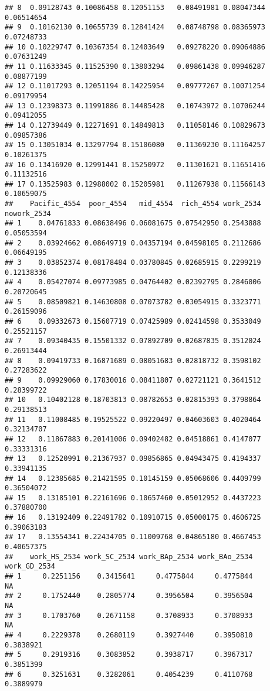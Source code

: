 \documentclass[
]{article}
\begin{document}
\begin{verbatim}
## 8  0.09128743 0.10086458 0.12051153   0.08491981 0.08047344    0.06514654
## 9  0.10162130 0.10655739 0.12841424   0.08748798 0.08365973    0.07248733
## 10 0.10229747 0.10367354 0.12403649   0.09278220 0.09064886    0.07631249
## 11 0.11633345 0.11525390 0.13803294   0.09861438 0.09946287    0.08877199
## 12 0.11017293 0.12051194 0.14225954   0.09777267 0.10071254    0.09179954
## 13 0.12398373 0.11991886 0.14485428   0.10743972 0.10706244    0.09412055
## 14 0.12739449 0.12271691 0.14849813   0.11058146 0.10829673    0.09857386
## 15 0.13051034 0.13297794 0.15106080   0.11369230 0.11164257    0.10261375
## 16 0.13416920 0.12991441 0.15250972   0.11301621 0.11651416    0.11132516
## 17 0.13525983 0.12988002 0.15205981   0.11267938 0.11566143    0.10659075
##    Pacific_4554  poor_4554   mid_4554  rich_4554 work_2534 nowork_2534
## 1    0.04761833 0.08638496 0.06081675 0.07542950 0.2543888  0.05053594
## 2    0.03924662 0.08649719 0.04357194 0.04598105 0.2112686  0.06649195
## 3    0.03852374 0.08178484 0.03780845 0.02685915 0.2299219  0.12138336
## 4    0.05427074 0.09773985 0.04764402 0.02392795 0.2846006  0.20720645
## 5    0.08509821 0.14630808 0.07073782 0.03054915 0.3323771  0.26159096
## 6    0.09332673 0.15607719 0.07425989 0.02414598 0.3533049  0.25521157
## 7    0.09340435 0.15501332 0.07892709 0.02687835 0.3512024  0.26913444
## 8    0.09419733 0.16871689 0.08051683 0.02818732 0.3598102  0.27283622
## 9    0.09929060 0.17830016 0.08411807 0.02721121 0.3641512  0.28399722
## 10   0.10402128 0.18703813 0.08782653 0.02815393 0.3798864  0.29138513
## 11   0.11008485 0.19525522 0.09220497 0.04603603 0.4020464  0.32134707
## 12   0.11867883 0.20141006 0.09402482 0.04518861 0.4147077  0.33331316
## 13   0.12520991 0.21367937 0.09856865 0.04943475 0.4194337  0.33941135
## 14   0.12385685 0.21421595 0.10145159 0.05068606 0.4409799  0.36504072
## 15   0.13185101 0.22161696 0.10657460 0.05012952 0.4437223  0.37880700
## 16   0.13192409 0.22491782 0.10910715 0.05000175 0.4606725  0.39063183
## 17   0.13554341 0.22434705 0.11009768 0.04865180 0.4667453  0.40657375
##    work_HS_2534 work_SC_2534 work_BAp_2534 work_BAo_2534 work_GD_2534
## 1     0.2251156    0.3415641     0.4775844     0.4775844           NA
## 2     0.1752440    0.2805774     0.3956504     0.3956504           NA
## 3     0.1703760    0.2671158     0.3708933     0.3708933           NA
## 4     0.2229378    0.2680119     0.3927440     0.3950810    0.3838921
## 5     0.2919316    0.3083852     0.3938717     0.3967317    0.3851399
## 6     0.3251631    0.3282061     0.4054239     0.4110768    0.3889979

\end{verbatim}
\end{document}
